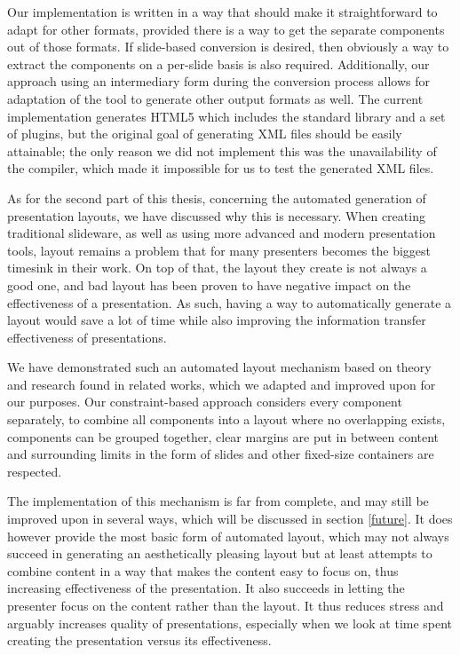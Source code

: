    Our implementation is written in a way that should make it straightforward
   to adapt for other formats, provided there is a way to get the separate
   components out of those formats. If slide-based conversion is desired, then
   obviously a way to extract the components on a per-slide basis is also
   required. Additionally, our approach using an intermediary form during the
   conversion process allows for adaptation of the tool to generate other
   output formats as well. The current implementation generates HTML5 which
   includes the \mxp standard library and a set of plugins, but the original
   goal of generating \mxp XML files should be easily attainable; the only
   reason we did not implement this was the unavailability of the \mxp
   compiler, which made it impossible for us to test the generated XML files.

   As for the second part of this thesis, concerning the automated generation
   of presentation layouts, we have discussed why this is necessary. When
   creating traditional slideware, as well as using more advanced and modern
   presentation tools, layout remains a problem that for many presenters
   becomes the biggest timesink in their work. On top of that, the layout they
   create is not always a good one, and bad layout has been proven to have
   negative impact on the effectiveness of a presentation. As such, having a
   way to automatically generate a layout would save a lot of time while also
   improving the information transfer effectiveness of presentations.

   We have demonstrated such an automated layout mechanism based on theory and
   research found in related works, which we adapted and improved upon for our
   purposes. Our constraint-based approach considers every component
   separately, to combine all components into a layout where no overlapping
   exists, components can be grouped together, clear margins are put in between
   content and surrounding limits in the form of slides and other fixed-size
   containers are respected.

   The implementation of this mechanism is far from complete, and may still be
   improved upon in several ways, which will be discussed in section
   \ref{future}. It does however provide the most basic form of automated
   layout, which may not always succeed in generating an aesthetically pleasing
   layout but at least attempts to combine content in a way that makes the
   content easy to focus on, thus increasing effectiveness of the presentation.
   It also succeeds in letting the presenter focus on the content rather than
   the layout. It thus reduces stress and arguably increases quality of
   presentations, especially when we look at time spent creating the
   presentation versus its effectiveness.

